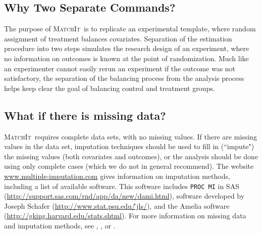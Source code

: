 \documentclass[oneside,letterpaper,titlepage]{article}
\newcommand{\MatchIt}{\textsc{MatchIt}}
\begin{document}
\subsection{Why Two Separate Commands?}
The purpose of \MatchIt\ is to replicate an experimental template,
where random assignment of treatment balances covariates.  Separation
of the estimation procedure into two steps simulates the research
design of an experiment, where no information on outcomes is known at
the point of randomization.  Much like an experimenter cannot easily
rerun an experiment if the outcome was not satisfactory, the
separation of the balancing process from the analysis process helps
keep clear the goal of balancing control and treatment groups.

\subsection{What if there is missing data?}
\MatchIt\ requires complete data sets, with no missing values.  If
there are missing values in the data set, imputation techniques should
be used to fill in (``impute") the missing values (both covariates and
outcomes), or the analysis should be done using only complete cases
(which we do not in general recommend).  The website
\href{www.multiple-imputation.com}{www.multiple-imputation.com} gives
information on imputation methods, including a list of available
software.  This software includes \texttt{PROC MI} in SAS
(\href{http://support.sas.com/rnd/app/da/new/dami.html}{http://support.sas.com/rnd/app/da/new/dami.html}),
software developed by Joseph Schafer
(\href{http://www.stat.psu.edu/\~jls/}{http://www.stat.psu.edu/\~\,jls/}),
and the Amelia software \\
(\href{http://gking.harvard.edu/stats.shtml}{http://gking.harvard.edu/stats.shtml}).
For more information on missing data and imputation methods, see
\cite{KinHonJos01}, \cite{LitRub02}, or \cite{Schafer97}.
\end{document}
